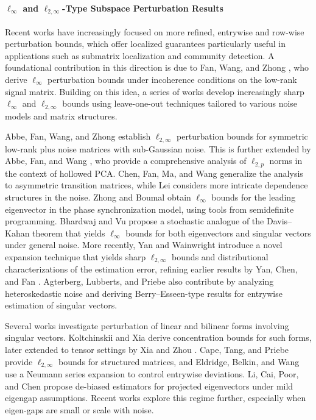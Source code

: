 \documentclass[reqno]{amsart}
\theoremstyle{plain}
\theoremstyle{definition}
\begin{document}
\paragraph*{\texorpdfstring{$\ell_{\infty}$}{linf} and \texorpdfstring{$\ell_{2,\infty}$}{l2inf}-Type Subspace Perturbation Results}
Recent works have increasingly focused on more refined, entrywise and row-wise perturbation bounds, which offer localized guarantees particularly useful in applications such as submatrix localization and community detection. A foundational contribution in this direction is due to Fan, Wang, and Zhong \cite{FWZ17}, who derive $\ell_\infty$ perturbation bounds under incoherence conditions on the low-rank signal matrix. Building on this idea, a series of works \cite{AFWZ20, AFW22, CLCPC21, CFMW19, BV23, YCF21, YW24} develop increasingly sharp $\ell_{\infty}$ and $\ell_{2,\infty}$ bounds using leave-one-out techniques tailored to various noise models and matrix structures.

Abbe, Fan, Wang, and Zhong \cite{AFWZ20} establish $\ell_{2,\infty}$ perturbation bounds for symmetric low-rank plus noise matrices with sub-Gaussian noise. This is further extended by Abbe, Fan, and Wang \cite{AFW22}, who provide a comprehensive analysis of $\ell_{2,p}$ norms in the context of hollowed PCA. Chen, Fan, Ma, and Wang \cite{CFMW19} generalize the analysis to asymmetric transition matrices, while Lei \cite{Lei19} considers more intricate dependence structures in the noise. Zhong and Boumal \cite{ZB18} obtain $\ell_{\infty}$ bounds for the leading eigenvector in the phase synchronization model, using tools from semidefinite programming. Bhardwaj and Vu \cite{BV23} propose a stochastic analogue of the Davis--Kahan theorem that yields $\ell_\infty$ bounds for both eigenvectors and singular vectors under general noise. More recently, Yan and Wainwright \cite{YW24} introduce a novel expansion technique that yields sharp $\ell_{2,\infty}$ bounds and distributional characterizations of the estimation error, refining earlier results by Yan, Chen, and Fan \cite{YCF21}. Agterberg, Lubberts, and Priebe \cite{ALP22} also contribute by analyzing heteroskedastic noise and deriving Berry--Esseen-type results for entrywise estimation of singular vectors.

Several works investigate perturbation of linear and bilinear forms involving singular vectors. Koltchinskii and Xia \cite{MR3565274} derive concentration bounds for such forms, later extended to tensor settings by Xia and Zhou \cite{MR3960915}. Cape, Tang, and Priebe \cite{CTP19} provide $\ell_{2,\infty}$ bounds for structured matrices, and Eldridge, Belkin, and Wang \cite{EBW18} use a Neumann series expansion to control entrywise deviations. Li, Cai, Poor, and Chen \cite{LCPC21} propose de-biased estimators for projected eigenvectors under mild eigengap assumptions. Recent works \cite{CWC21, Ag23} explore this regime further, especially when eigen-gaps are small or scale with noise.
\end{document}
